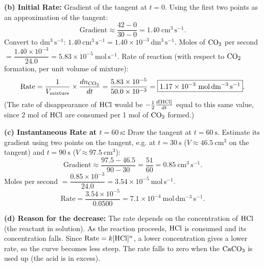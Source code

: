 \documentclass[11pt]{article}
\begin{document}
\begin{exoresolu}
\textbf{(b) Initial Rate:} Gradient of the tangent at $t=0$. Using the first two points as an approximation of the tangent:
\[ \text{Gradient} \approx \frac{42 - 0}{30 - 0} = 1.40\ \mathrm{cm^3\,s^{-1}}. \]
Convert to $\mathrm{dm^3\,s^{-1}}$: $1.40\ \mathrm{cm^3\,s^{-1}} = 1.40 \times 10^{-3}\ \mathrm{dm^3\,s^{-1}}$.
Moles of $\ce{CO2}$ per second $= \dfrac{1.40 \times 10^{-3}}{24.0} = 5.83 \times 10^{-5}\ \mathrm{mol\,s^{-1}}$.
Rate of reaction (with respect to $\ce{CO2}$ formation, per unit volume of mixture):
\[ \text{Rate} = \frac{1}{V_{\text{mixture}}} \times \frac{d n_{\ce{CO2}}}{dt} = \frac{5.83 \times 10^{-5}}{50.0 \times 10^{-3}} = \boxed{1.17 \times 10^{-3}\ \mathrm{mol\,dm^{-3}\,s^{-1}}}. \]
(The rate of disappearance of $\ce{HCl}$ would be $-\frac{1}{2}\frac{d[\ce{HCl}]}{dt}$ equal to this same value, since 2 mol of $\ce{HCl}$ are consumed per 1 mol of $\ce{CO2}$ formed.)

\textbf{(c) Instantaneous Rate at $t=60\ \mathrm{s}$:} Draw the tangent at $t=60\ \mathrm{s}$. Estimate its gradient using two points on the tangent, e.g. at $t=30\ \mathrm{s}$ ($V \approx 46.5\ \mathrm{cm^3}$ on the tangent) and $t=90\ \mathrm{s}$ ($V \approx 97.5\ \mathrm{cm^3}$):
\[ \text{Gradient} \approx \frac{97.5 - 46.5}{90 - 30} = \frac{51}{60} = 0.85\ \mathrm{cm^3\,s^{-1}}. \]
Moles per second $= \dfrac{0.85 \times 10^{-3}}{24.0} = 3.54 \times 10^{-5}\ \mathrm{mol\,s^{-1}}$.
\[ \text{Rate} = \frac{3.54 \times 10^{-5}}{0.0500} = \boxed{7.1 \times 10^{-4}\ \mathrm{mol\,dm^{-3}\,s^{-1}}}. \]

\textbf{(d) Reason for the decrease:} The rate depends on the concentration of $\ce{HCl}$ (the reactant in solution). As the reaction proceeds, $\ce{HCl}$ is consumed and its concentration falls. Since $\text{Rate} = k[\ce{HCl}]^n$, a lower concentration gives a lower rate, so the curve becomes less steep. The rate falls to zero when the $\ce{CaCO3}$ is used up (the acid is in excess).
\end{exoresolu}
\end{document}
